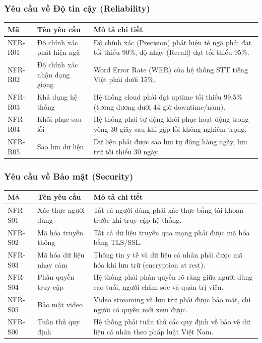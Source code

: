\subsubsection{Yêu cầu về Độ tin cậy (Reliability)}

\begin{table}[h!]
\centering
\label{tab:nfr-rel}
\begin{tabular}{|L{1.5cm}|L{3.5cm}|L{8.5cm}|}
\hline
\textbf{Mã} & \textbf{Tên yêu cầu} & \textbf{Mô tả chi tiết} \\
\hline
NFR-R01 & Độ chính xác phát hiện ngã & Độ chính xác (Precision) phát hiện té ngã phải đạt tối thiểu 90\%, độ nhạy (Recall) đạt tối thiểu 95\%. \\
\hline
NFR-R02 & Độ chính xác nhận dạng giọng & Word Error Rate (WER) của hệ thống STT tiếng Việt phải dưới 15\%. \\
\hline
NFR-R03 & Khả dụng hệ thống & Hệ thống cloud phải đạt uptime tối thiểu 99.5\% (tương đương dưới 44 giờ downtime/năm). \\
\hline
NFR-R04 & Khôi phục sau lỗi & Hệ thống phải tự động khôi phục hoạt động trong vòng 30 giây sau khi gặp lỗi không nghiêm trọng. \\
\hline
NFR-R05 & Sao lưu dữ liệu & Dữ liệu phải được sao lưu tự động hàng ngày, lưu trữ tối thiểu 30 ngày. \\
\hline
\end{tabular}
\end{table}

\subsubsection{Yêu cầu về Bảo mật (Security)}

\begin{table}[h!]
\centering
\label{tab:nfr-sec}
\begin{tabular}{|L{1.5cm}|L{3.5cm}|L{8.5cm}|}
\hline
\textbf{Mã} & \textbf{Tên yêu cầu} & \textbf{Mô tả chi tiết} \\
\hline
NFR-S01 & Xác thực người dùng & Tất cả người dùng phải xác thực bằng tài khoản trước khi truy cập hệ thống. \\
\hline
NFR-S02 & Mã hóa truyền thông & Tất cả dữ liệu truyền qua mạng phải được mã hóa bằng TLS/SSL. \\
\hline
NFR-S03 & Mã hóa dữ liệu nhạy cảm & Thông tin y tế và dữ liệu cá nhân phải được mã hóa khi lưu trữ (encryption at rest). \\
\hline
NFR-S04 & Phân quyền truy cập & Hệ thống phải phân quyền rõ ràng giữa người dùng cao tuổi, người chăm sóc và quản trị viên. \\
\hline
NFR-S05 & Bảo mật video & Video streaming và lưu trữ phải được bảo mật, chỉ người có quyền mới xem được. \\
\hline
NFR-S06 & Tuân thủ quy định & Hệ thống phải tuân thủ các quy định về bảo vệ dữ liệu cá nhân theo pháp luật Việt Nam. \\
\hline
\end{tabular}
\end{table}

